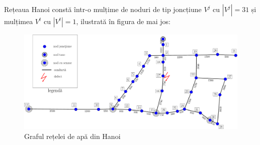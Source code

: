 Rețeaua Hanoi constă într-o mulțime de noduri de tip joncțiune $V^j$ cu $|V^j| = 31$ și mulțimea $V^t$ cu $|V^t|=1$, ilustrată în figura de mai jos:
 
\begin{figure}[h]
\centering
\includegraphics[width=\textwidth]{pics/c1_pics/hanoi_network.pdf}
\caption{Graful rețelei de apă din Hanoi}
\end{figure}




